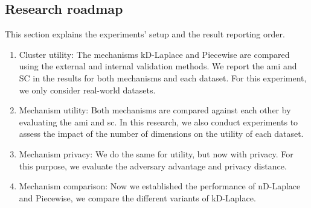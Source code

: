 \subsection{Research roadmap} \label{research-roadmap}
This section explains the experiments' setup and the result reporting order.
\begin{enumerate}
      \item Cluster utility: The mechanisms kD-Laplace and Piecewise are compared using the external and internal validation methods.
            We report the \gls{ami} and SC in the results for both mechanisms and each dataset.
            For this experiment, we only consider real-world datasets.
      \item Mechanism utility: Both mechanisms are compared against each other by evaluating the \gls{ami} and \gls{sc}.
            In this research, we also conduct experiments to assess the impact of the number of dimensions on the utility of each dataset.
      \item Mechanism privacy: We do the same for utility, but now with privacy.
            For this purpose, we evaluate the adversary advantage and privacy distance.
      \item Mechanism comparison: Now we established the performance of nD-Laplace and Piecewise, we compare the different variants of kD-Laplace.

\end{enumerate}
